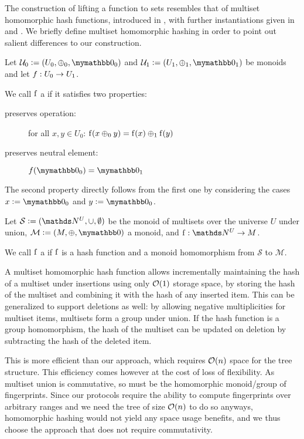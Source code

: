 The construction of lifting a function to sets resembles that of multiset homomorphic hash functions, introduced in \cite{clarke2003incremental}, with further instantiations given in \cite{cathalo2009comparing} and \cite{maitin2017elliptic}. We briefly define multiset homomorphic hashing in order to point out salient differences to our construction.

\begin{definition}
Let $\mathcal{U}_0 \defeq (U_0, \groupaddsym_0, \neutraladd_0)$ and $\mathcal{U}_1 \defeq (U_1, \groupaddsym_1, \neutraladd_1)$ be monoids and let ${f}: {U_0} \rightarrow {U_1}$.

We call $\operatorname{f}$ a  if it satisfies two properties:

\begin{description}
  \item[preserves operation:] for all $x, y \in U_0$: $\operatorname{f}(x \oplus_0 y) = \operatorname{f}(x) \oplus_1 \operatorname{f}(y)$
  \item[preserves neutral element:] $f(\neutraladd_0) = \neutraladd_1$
\end{description}

The second property directly follows from the first one by considering the cases $x \defeq \neutraladd_0$ and $y \defeq \neutraladd_0$.
\end{definition}

\begin{definition}
Let $\mathcal{S} \defeq (\N^U, \cup, \emptyset)$ be the monoid of multisets over the universe $U$ under union, $\mathcal{M} \defeq (M, \groupaddsym, \neutraladd)$ a monoid, and $\fun{\f}{\N^U}{M}$.

We call $\operatorname{f}$ a  if $\operatorname{f}$ is a hash function and a monoid homomorphism from $\mathcal{S}$ to $\mathcal{M}$.
\end{definition}

A multiset homomorphic hash function allows incrementally maintaining the hash of a multiset under insertions using only $\mathcal{O}(1)$ storage space, by storing the hash of the multiset and combining it with the hash of any inserted item. This can be generalized to support deletions as well: by allowing negative multiplicities for multiset items, multisets form a group under union. If the hash function is a group homomorphism, the hash of the multiset can be updated on deletion by subtracting the hash of the deleted item.

This is more efficient than our approach, which requires $\mathcal{O}(n)$ space for the tree structure. This efficiency comes however at the cost of loss of flexibility. As multiset union is commutative, so must be the homomorphic monoid/group of fingerprints. Since our protocols require the ability to compute fingerprints over arbitrary ranges and we need the tree of size $\mathcal{O}(n)$ to do so anyways, homomorphic hashing would not yield any space usage benefits, and we thus choose the approach that does not require commutativity.

